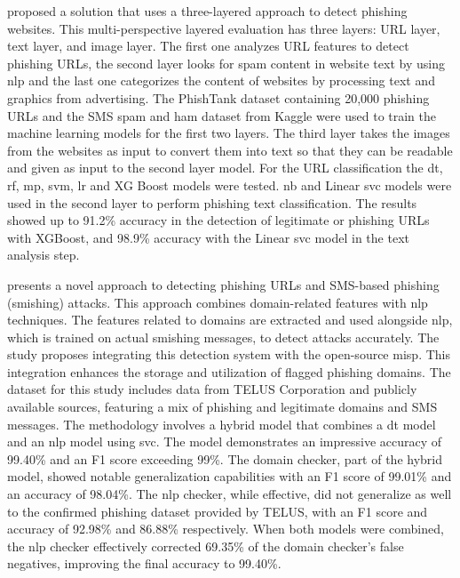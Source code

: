 \citet{Shaukat2023} proposed a solution that uses a three-layered approach to detect phishing websites. This multi-perspective layered evaluation has three layers: URL layer, text layer, and image layer. The first one analyzes URL features to detect phishing URLs, the second layer looks for spam content in website text by using \ac{nlp} and the last one categorizes the content of websites by processing text and graphics from advertising. The PhishTank dataset containing 20,000 phishing URLs and the SMS spam and ham dataset from Kaggle were used to train the machine learning models for the first two layers. The third layer takes the images from the websites as input to convert them into text so that they can be readable and given as input to the second layer model. For the URL classification the \ac{dt}, \ac{rf}, \ac{mp}, \ac{svm}, \ac{lr} and XG Boost models were tested. \ac{nb} and Linear \ac{svc} models were used in the second layer to perform phishing text classification. The results showed up to 91.2\% accuracy in the detection of legitimate or phishing URLs with XGBoost, and 98.9\% accuracy with the Linear \ac{svc} model in the text analysis step.

\citet{Karhani2023206} presents a novel approach to detecting phishing URLs and SMS-based phishing (smishing) attacks. This approach combines domain-related features with \ac{nlp} techniques. The features related to domains are extracted and used alongside \ac{nlp}, which is trained on actual smishing messages, to detect attacks accurately. The study proposes integrating this detection system with the open-source \ac{misp}. This integration enhances the storage and utilization of flagged phishing domains.
The dataset for this study includes data from TELUS Corporation and publicly available sources, featuring a mix of phishing and legitimate domains and SMS messages. The methodology involves a hybrid model that combines a \ac{dt} model and an \ac{nlp} model using \ac{svc}.
The model demonstrates an impressive accuracy of 99.40\% and an F1 score exceeding 99\%. The domain checker, part of the hybrid model, showed notable generalization capabilities with an F1 score of 99.01\% and an accuracy of 98.04\%.
The \ac{nlp} checker, while effective, did not generalize as well to the confirmed phishing dataset provided by TELUS, with an F1 score and accuracy of 92.98\% and 86.88\% respectively.
When both models were combined, the \ac{nlp} checker effectively corrected 69.35\% of the domain checker's false negatives, improving the final accuracy to 99.40\%.


